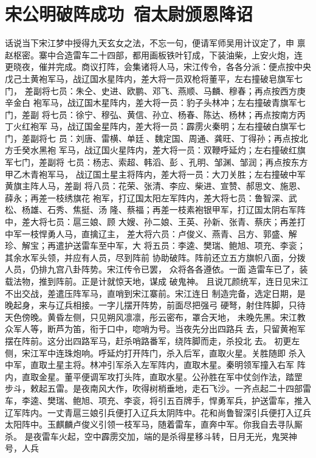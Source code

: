 \chapter{宋公明破阵成功~宿太尉颁恩降诏}

话说当下宋江梦中授得九天玄女之法，不忘一句，便请军师吴用计议定了，申
禀赵枢密。寨中合造雷车二十四部，都用画板铁叶钉成，下装油柴，上安火炮，连
更晓夜，催并完成。商议打阵，会集诸将人马，宋江传令，各各分派：便点按中央
戊己土黄袍军马，战辽国水星阵内，差大将一员双枪将董平，左右撞破皂旗军七门，
差副将七员：朱仝、史进、欧鹏、邓飞、燕顺、马麟、穆春；再点按西方庚辛金白
袍军马，战辽国木星阵内，差大将一员：豹子头林冲；左右撞破青旗军七门，差副
将七员：徐宁、穆弘、黄信、孙立、杨春、陈达、杨林；再点按南方丙丁火红袍军
马，战辽国金星阵内，差大将一员：霹雳火秦明；左右撞破白旗军七门，差副将七
员：刘唐、雷横、单廷、魏定国、周通、龚旺、丁得孙；再点按北方壬癸水黑袍
军马，战辽国火星阵内，差大将一员：双鞭呼延灼；左右撞破红旗军七门，差副将
七员：杨志、索超、韩滔、彭、孔明、邹渊、邹润；再点按东方甲乙木青袍军马，
战辽国土星主将阵内，差大将一员：大刀关胜；左右撞破中军黄旗主阵人马，差副
将八员：花荣、张清、李应、柴进、宣赞、郝思文、施恩、薛永；再差一枝绣旗花
袍军，打辽国太阳左军阵内，差大将七员：鲁智深、武松、杨雄、石秀、焦挺、汤
隆、蔡福；再差一枝素袍银甲军，打辽国太阴右军阵中，差大将七员：扈三娘、顾
大嫂、孙二娘、王英、孙新、张青、蔡庆；再差打中军一枝悍勇人马，直擒辽主，
差大将六员：卢俊义、燕青、吕方、郭盛、解珍、解宝；再遣护送雷车至中军，大
将五员：李逵、樊瑞、鲍旭、项充、李衮；其余水军头领，并应有人员，尽到阵前
协助破阵。阵前还立五方旗帜八面，分拨人员，仍排九宫八卦阵势。宋江传令已罢，
众将各各遵依。一面造雷车已了，装载法物，推到阵前。正是计就惊天地，谋成
破鬼神。
且说兀颜统军，连日见宋江不出交战，差遣压阵军马，直哨到宋江寨前。宋江连日
制造完备，选定日期，是晚起身，来与辽兵相接。一字儿摆开阵势，前面尽把强弓
硬弩，射住阵脚，只待天色傍晚。黄昏左侧，只见朔风凛凛，彤云密布，罩合天地，
未晚先黑。宋江教众军人等，断芦为笛，衔于口中，唿哨为号。当夜先分出四路兵
去，只留黄袍军摆在阵前。这分出四路军马，赶杀哨路番军，绕阵脚而走，杀投北
去。
初更左侧，宋江军中连珠炮响。呼延灼打开阵门，杀入后军，直取火星。关胜随即
杀入中军，直取土星主将。林冲引军杀入左军阵内，直取木星。秦明领军撞入右军
阵内，直取金星。董平便调军攻打头阵，直取水星。公孙胜在军中仗剑作法，踏罡
步斗，敕起五雷。是夜南风大作，吹得树梢垂地，走石飞沙。一齐点起二十四部雷
车，李逵、樊瑞、鲍旭、项充、李衮，将引五百牌手，悍勇军兵，护送雷车，推入
辽军阵内。一丈青扈三娘引兵便打入辽兵太阴阵中。花和尚鲁智深引兵便打入辽兵
太阳阵中。玉麒麟卢俊义引领一枝军马，随着雷车，直奔中军。你我自去寻队厮杀。
是夜雷车火起，空中霹雳交加，端的是杀得星移斗转，日月无光，鬼哭神号，人兵
